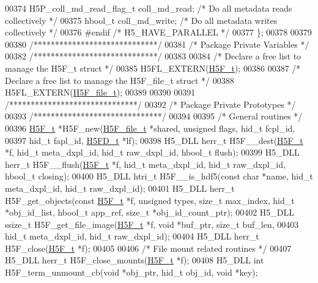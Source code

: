 \begin{DoxyCode}
00374     H5P\_coll\_md\_read\_flag\_t coll\_md\_read;  \textcolor{comment}{/* Do all metadata reads collectively */}
00375     hbool\_t             coll\_md\_write;  \textcolor{comment}{/* Do all metadata writes collectively */}
00376 \textcolor{preprocessor}{#endif }\textcolor{comment}{/* H5\_HAVE\_PARALLEL */}\textcolor{preprocessor}{}
00377 \};
00378 
00379 
00380 \textcolor{comment}{/*****************************/}
00381 \textcolor{comment}{/* Package Private Variables */}
00382 \textcolor{comment}{/*****************************/}
00383 
00384 \textcolor{comment}{/* Declare a free list to manage the H5F\_t struct */}
00385 H5FL\_EXTERN(\hyperlink{struct_h5_f__t}{H5F\_t});
00386 
00387 \textcolor{comment}{/* Declare a free list to manage the H5F\_file\_t struct */}
00388 H5FL\_EXTERN(\hyperlink{struct_h5_f__file__t}{H5F\_file\_t});
00389 
00390 
00391 \textcolor{comment}{/******************************/}
00392 \textcolor{comment}{/* Package Private Prototypes */}
00393 \textcolor{comment}{/******************************/}
00394 
00395 \textcolor{comment}{/* General routines */}
00396 \hyperlink{struct_h5_f__t}{H5F\_t} *H5F\_new(\hyperlink{struct_h5_f__file__t}{H5F\_file\_t} *shared, \textcolor{keywordtype}{unsigned} flags, hid\_t fcpl\_id,
00397     hid\_t fapl\_id, \hyperlink{struct_h5_f_d__t}{H5FD\_t} *lf);
00398 H5\_DLL herr\_t H5F\_\_dest(\hyperlink{struct_h5_f__t}{H5F\_t} *f, hid\_t meta\_dxpl\_id, hid\_t raw\_dxpl\_id, hbool\_t flush);
00399 H5\_DLL herr\_t H5F\_\_flush(\hyperlink{struct_h5_f__t}{H5F\_t} *f, hid\_t meta\_dxpl\_id, hid\_t raw\_dxpl\_id, hbool\_t closing);
00400 H5\_DLL htri\_t H5F\_\_is\_hdf5(\textcolor{keyword}{const} \textcolor{keywordtype}{char} *name, hid\_t meta\_dxpl\_id, hid\_t raw\_dxpl\_id);
00401 H5\_DLL herr\_t H5F\_get\_objects(\textcolor{keyword}{const} \hyperlink{struct_h5_f__t}{H5F\_t} *f, \textcolor{keywordtype}{unsigned} types, \textcolor{keywordtype}{size\_t} max\_index, hid\_t *obj\_id\_list, 
      hbool\_t app\_ref, \textcolor{keywordtype}{size\_t} *obj\_id\_count\_ptr);
00402 H5\_DLL ssize\_t H5F\_get\_file\_image(\hyperlink{struct_h5_f__t}{H5F\_t} *f, \textcolor{keywordtype}{void} *buf\_ptr, \textcolor{keywordtype}{size\_t} buf\_len,
00403     hid\_t meta\_dxpl\_id, hid\_t raw\_dxpl\_id);
00404 H5\_DLL herr\_t H5F\_close(\hyperlink{struct_h5_f__t}{H5F\_t} *f);
00405 
00406 \textcolor{comment}{/* File mount related routines */}
00407 H5\_DLL herr\_t H5F\_close\_mounts(\hyperlink{struct_h5_f__t}{H5F\_t} *f);
00408 H5\_DLL \textcolor{keywordtype}{int} H5F\_term\_unmount\_cb(\textcolor{keywordtype}{void} *obj\_ptr, hid\_t obj\_id, \textcolor{keywordtype}{void} *key);

\end{DoxyCode}
